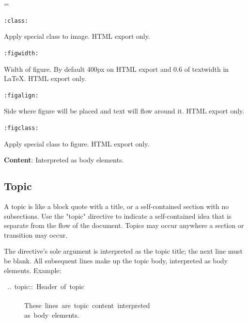 \documentclass[12pt]{article}
\newenvironment{deflist}[1]{%
\begin{list}{}
{\renewcommand{\makelabel}[1]{\textbf{##1}\hfill}
\settowidth{\labelwidth}{\textbf{#1}}
\leftmargin=\labelwidth
\advance \leftmargin\labelsep}}
{\end{list}}
\begin{document}
\begin{itemize}
\begin{deflist}{iii}
 \begin{center}
\end{center}

\item[ \texttt{:class:}]

Apply special class to image. HTML export only.

\item[ \texttt{:figwidth:}]

Width of figure. By default 400px on HTML export and 0.6 of textwidth
in \LaTeX{}. HTML export only.

\item[ \texttt{:figalign:}]

Side where figure will be placed and text will flow around it. HTML
export only.

\item[ \texttt{:figclass:}]

Apply special class to figure. HTML export only.
\end{deflist}

\item
\textbf{Content}: Interpreted as body elements.
\end{itemize}
\hypertarget{ltopic}{}
\subsection{Topic}

A topic is like a block quote with a title, or a self-contained section with
no subsections. Use the "topic" directive to indicate a self-contained idea
that is separate from the flow of the document. Topics may occur anywhere
a section or transition may occur.

The directive's sole argument is interpreted as the topic title; the next line
must be blank. All subsequent lines make up the topic body, interpreted as
body elements. Example:

\begin{ttfamily}\begin{flushleft}
\mbox{~..~topic::~Header~of~topic}\\
\mbox{}\\
\mbox{~~~~~~These~lines~are~topic~content~interpreted}\\
\mbox{~~~~~~as~body~elements.}\\
\end{flushleft}\end{ttfamily}
\end{document}

